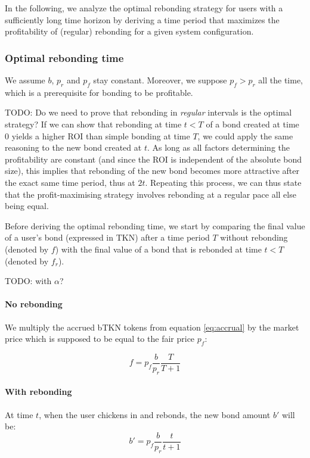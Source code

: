 \documentclass{article}
\begin{document}
In the following, we analyze the optimal rebonding strategy for users with a sufficiently long time horizon by deriving a time period that maximizes the profitability of (regular) rebonding for a given system configuration.

\subsubsection{Optimal rebonding time}
  \label{sec:T_OP}
We assume $b$, $p_r$ and $p_f$ stay constant. Moreover, we suppose $p_f>p_r$ all the time, which is a prerequisite for bonding to be profitable. 

TODO: Do we need to prove that rebonding in \textit{regular} intervals is the optimal strategy? If we can show that rebonding at time $t<T$ of a bond created at time 0 yields a higher ROI than simple bonding at time $T$, we could apply the same reasoning to the new bond created at $t$. As long as all factors determining the profitability are constant (and since the ROI is independent of the absolute bond size), this implies that rebonding of the new bond becomes more attractive after the exact same time period, thus at $2t$. Repeating this process, we can thus state that the profit-maximising strategy involves rebonding at a regular pace all else being equal.

Before deriving the optimal rebonding time, we start by comparing the final value of a user's bond (expressed in TKN) after a time period $T$ without rebonding (denoted by $f$) with the final value of a bond that is rebonded at time $t<T$ (denoted by $f_r$). 

TODO: with $\alpha$?

\paragraph{No rebonding}
We multiply the accrued bTKN tokens from equation \ref{eq:accrual} by the market price which is supposed to be equal to the fair price $p_f$:

\begin{equation}
  \label{eq:o-s}
f = p_f\frac{b}{p_r}\frac{T}{T+1}
\end{equation}

\paragraph{With rebonding}
At time $t$, when the user chickens in and rebonds, the new bond amount $b'$ will be:
\begin{equation}
b'= p_f\frac{b}{p_r}\frac{t}{t+1}
\end{equation}
\end{document}
